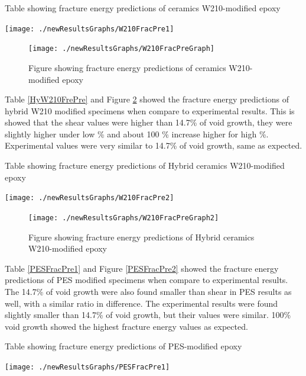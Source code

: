 \documentclass[numbers=noendperiod,chapterprefix=on]{icldt} %
\begin{document}
{\begin{table}[!htpb]
\centering
\caption{Table showing fracture energy predictions of ceramics W210-modified epoxy} \label{W210FrePre}
\texttt{[image: ./newResultsGraphs/W210FracPre1]}
\end{table}
\FloatBarrier

\begin{figure}[!t]
\centering
\texttt{[image: ./newResultsGraphs/W210FracPreGraph]}
\caption{Figure showing fracture energy predictions of ceramics W210-modified epoxy}
\label{W210FrePre2}
\end{figure}
\FloatBarrier

Table \ref{HyW210FrePre} and Figure \ref{HyW210FrePre2} showed the fracture energy predictions of hybrid W210 modified specimens when compare to experimental results. This is showed that the shear values were higher than 14.7\% of void growth, they were slightly higher under low \% and about 100 \% increase higher for high \%. Experimental values were very similar to 14.7\% of void growth, same as expected. 

\begin{table}[!htpb]
\centering
\caption{Table showing fracture energy predictions of Hybrid ceramics W210-modified epoxy} \label{HyW210FrePre}
\texttt{[image: ./newResultsGraphs/W210FracPre2]}
\end{table}
\FloatBarrier

\begin{figure}[!hp]
\centering
\texttt{[image: ./newResultsGraphs/W210FracPreGraph2]}
\caption{Figure showing fracture energy predictions of Hybrid ceramics W210-modified epoxy}
\label{HyW210FrePre2}
\end{figure}
\FloatBarrier

Table \ref{PESFracPre1} and Figure \ref{PESFracPre2} showed the fracture energy predictions of PES modified specimens when compare to experimental results. The 14.7\% of void growth were also found smaller than shear in PES results as well, with a similar ratio in difference. The experimental results were found slightly smaller than 14.7\% of void growth, but their values were similar. 100\% void growth showed the highest fracture energy values as expected.

\begin{table}[!htpb]
\centering
\caption{Table showing fracture energy predictions of PES-modified epoxy} 
\texttt{[image: ./newResultsGraphs/PESFracPre1]}
\label{PESFracPre1}
\end{table}
\FloatBarrier

}
\end{document}

